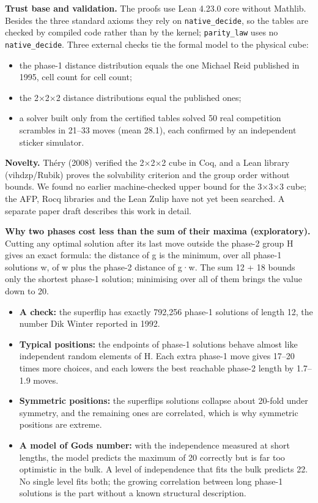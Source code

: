 \documentclass[11pt,a4paper]{article}
\providecommand{\tightlist}{\setlength{\itemsep}{0pt}\setlength{\parskip}{0pt}}
\begin{document}
\textbf{Trust base and validation.} The proofs use Lean 4.23.0 core without Mathlib. Besides the three standard axioms they rely on \texttt{native\_\allowbreak{}decide}, so the tables are checked by compiled code rather than by the kernel; \texttt{parity\_\allowbreak{}law} uses no \texttt{native\_\allowbreak{}decide}. Three external checks tie the formal model to the physical cube:

\begin{itemize}
\tightlist
\item
  the phase-1 distance distribution equals the one Michael Reid published in 1995, cell count for cell count;
\item
  the 2×2×2 distance distributions equal the published ones;
\item
  a solver built only from the certified tables solved 50 real competition scrambles in 21--33 moves (mean 28.1), each confirmed by an independent sticker simulator.
\end{itemize}

\textbf{Novelty.} Théry (2008) verified the 2×2×2 cube in Coq, and a Lean library (vihdzp/Rubik) proves the solvability criterion and the group order without bounds. We found no earlier machine-checked upper bound for the 3×3×3 cube; the AFP, Rocq libraries and the Lean Zulip have not yet been searched. A separate paper draft describes this work in detail.

\textbf{Why two phases cost less than the sum of their maxima (exploratory).} Cutting any optimal solution after its last move outside the phase-2 group H gives an exact formula: the distance of g is the minimum, over all phase-1 solutions w, of \textbar w\textbar{} plus the phase-2 distance of g·w. The sum 12 + 18 bounds only the shortest phase-1 solution; minimising over all of them brings the value down to 20.

\begin{itemize}
\tightlist
\item
  \textbf{A check:} the superflip has exactly 792,256 phase-1 solutions of length 12, the number Dik Winter reported in 1992.
\item
  \textbf{Typical positions:} the endpoints of phase-1 solutions behave almost like independent random elements of H. Each extra phase-1 move gives 17--20 times more choices, and each lowers the best reachable phase-2 length by 1.7--1.9 moves.
\item
  \textbf{Symmetric positions:} the superflip\textquotesingle s solutions collapse about 20-fold under symmetry, and the remaining ones are correlated, which is why symmetric positions are extreme.
\item
  \textbf{A model of God\textquotesingle s number:} with the independence measured at short lengths, the model predicts the maximum of 20 correctly but is far too optimistic in the bulk. A level of independence that fits the bulk predicts 22. No single level fits both; the growing correlation between long phase-1 solutions is the part without a known structural description.
\end{itemize}
\end{document}
